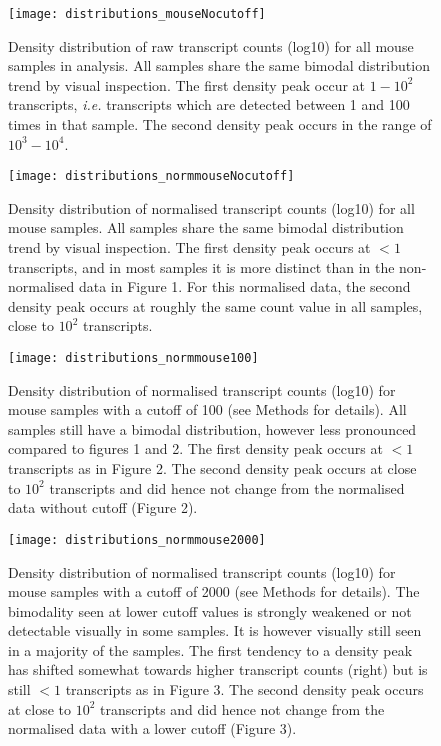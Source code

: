 \documentclass{article}
\begin{document}
\begin{figure}[h]
\begin{center}
\texttt{[image: distributions\_mouseNocutoff]} %
\caption{Density distribution of raw transcript counts (log10) for all mouse samples in analysis. All samples share the same bimodal distribution trend by visual inspection. The first density peak occur at $1 - 10^2$ transcripts, \textit{i.e.} transcripts which are detected between 1 and 100 times in that sample. The second density peak occurs in the range of $10^3 - 10^4$.}
\end{center}
\end{figure}

\begin{figure}[h]
\begin{center}
\texttt{[image: distributions\_normmouseNocutoff]} %
\caption{Density distribution of normalised transcript counts (log10) for all mouse samples. All samples share the same bimodal distribution trend by visual inspection. The first density peak occurs at $<1$ transcripts, and in most samples it is more distinct than in the non-normalised data in Figure 1. For this normalised data, the second density peak occurs at roughly the same count value in all samples, close to $10^2$ transcripts.}
\end{center}
\end{figure}

\begin{figure}[h]
\begin{center}
\texttt{[image: distributions\_normmouse100]} %
\caption{Density distribution of normalised transcript counts (log10) for mouse samples with a cutoff of 100 (see Methods for details). All samples still have a bimodal distribution, however less pronounced compared to figures 1 and 2. The first density peak occurs at $<1$ transcripts as in Figure 2. The second density peak occurs at close to $10^2$ transcripts and did hence not change from the normalised data without cutoff (Figure 2).}
\end{center}
\end{figure}

\begin{figure}[h]
\begin{center}
\texttt{[image: distributions\_normmouse2000]} %
\caption{Density distribution of normalised transcript counts (log10) for mouse samples with a cutoff of 2000 (see Methods for details). The bimodality seen at lower cutoff values is strongly weakened or not detectable visually in some samples. It is however visually still seen in a majority of the samples. The first tendency to a density peak has shifted somewhat towards higher transcript counts (right) but is still $<1$ transcripts as in Figure 3. The second density peak occurs at close to $10^2$ transcripts and did hence not change from the normalised data with a lower cutoff (Figure 3).}
\end{center}
\end{figure}
\end{document}
